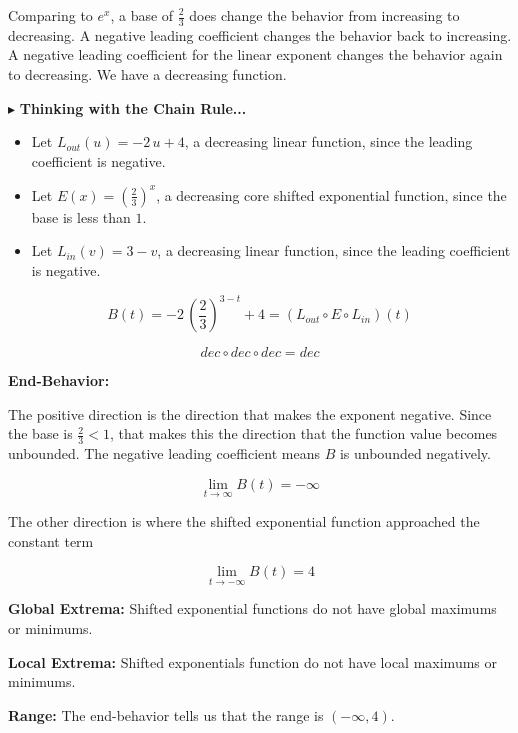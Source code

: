 \documentclass{ximera}
\begin{document}
\begin{example}
Comparing to $e^x$, a base of $\frac{2}{3}$ does change the behavior from increasing to decreasing. A negative leading coefficient changes the behavior back to increasing.  A negative leading coefficient for the linear exponent changes the behavior again to decreasing.  We have a decreasing function. 






$\blacktriangleright$ \textbf{Thinking with the Chain Rule...}




\begin{itemize}
\item Let $L_{out}(u) = -2 \, u + 4$, a decreasing linear function, since the leading coefficient is negative.
\item Let $E(x) = \left( \frac{2}{3} \right)^x$, a decreasing core shifted exponential function, since the base is less than $1$.
\item Let $L_{in}(v) = 3 - v$, a decreasing linear function, since the leading coefficient is negative.
\end{itemize}


\[
B(t) = -2 \, \left( \frac{2}{3} \right)^{3-t} + 4 = (L_{out} \circ E \circ L_{in})(t)
\]

\[  dec \circ dec \circ dec = dec  \]


\textbf{End-Behavior:} 



The positive direction is the direction that makes the exponent negative.  Since the base is $\frac{2}{3} < 1$, that makes this the direction that the function value becomes unbounded.  The negative leading coefficient means $B$ is unbounded negatively.



\[
\lim\limits_{t \to \infty} B(t) = -\infty
\]


The other direction is where the shifted exponential function approached the constant term



\[
\lim\limits_{t \to -\infty} B(t) = 4
\]










\textbf{Global Extrema:}  Shifted exponential functions do not have global maximums or minimums. 


\textbf{Local Extrema:}  Shifted exponentials function do not have local maximums or minimums. 



\textbf{Range:} The end-behavior tells us that the range is $(-\infty, 4)$.










\end{example}
\end{document}
